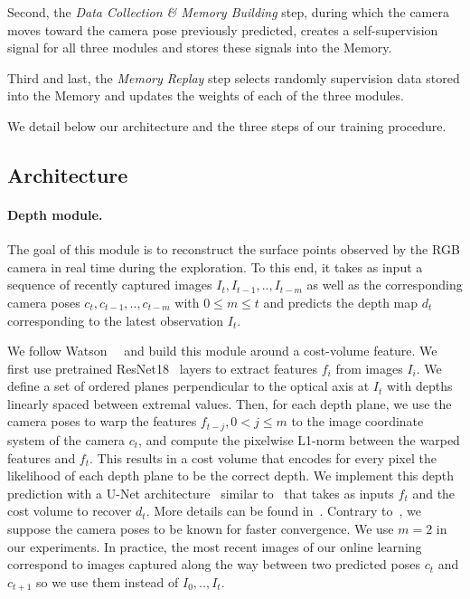 Second, the \emph{Data Collection \& Memory Building} step, during which the camera moves toward the camera pose previously predicted, creates a self-supervision signal for all three modules and stores these signals into the Memory. 

Third and last, the \emph{Memory Replay} step selects randomly supervision data stored into the Memory and updates the weights of each of the three modules.

We detail below our architecture and the three steps of our training procedure.

\subsection{Architecture}\label{sec:archi}

\paragraph{Depth module.} The goal of this module is to reconstruct the surface points observed by the RGB camera in real time during the exploration. To this end, it takes as input a sequence of recently captured images $I_t, I_{t-1}, .., I_{t-m}$ as well as the corresponding camera poses $c_t, c_{t-1}, .., c_{t-m}$ with $0 \leq m\leq t$  and predicts the depth map $d_t$ corresponding to the latest observation $I_t$. 

We follow Watson~\etal~\cite{watson-cvpr21-temporal-opportunist-manydepth} and build this module around a cost-volume feature. We first use pretrained ResNet18~\cite{he-cvpr16-deepresiduallearning} layers to extract features $f_i$ from images $I_i$. We define a set of ordered planes perpendicular to the optical axis at $I_t$ with depths linearly spaced between extremal values.
%
Then, for each depth plane, we use the camera poses to warp the features $f_{t-j}, 0<j\leq m$ to the image coordinate system of the camera $c_t$, and compute the pixelwise L1-norm between the warped features and $f_t$. This results in a cost volume that encodes for every pixel the likelihood of each depth plane to be the correct depth. 
%
We implement this depth prediction with a U-Net architecture~\cite{ronneberger-15-unet} similar to~\cite{watson-cvpr21-temporal-opportunist-manydepth} that takes as inputs $f_t$ and the cost volume to recover $d_t$. More details can be found in~\cite{watson-cvpr21-temporal-opportunist-manydepth}.
Contrary to~\cite{watson-cvpr21-temporal-opportunist-manydepth}, we suppose the camera poses to be known for faster convergence. We use $m=2$ in our experiments. In practice, the most recent images of our online learning correspond to images captured along the way between two predicted poses $c_t$ and $c_{t+1}$ so we use them instead of $I_0, .., I_t$.

